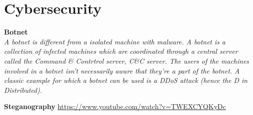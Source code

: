 \section{Cybersecurity}

\textbf{Botnet}   \cite{cybersecurity:botnets} \\
\textit{A botnet is different from a isolated machine with malware. A botnet is a collection of infected machines which are coordinated through a central server called the Command & Contrtrol server, C&C server. The users of the machines involved in a botnet isn't necessarily aware that they're a part of the botnet.  A classic example for which a botnet can be used is a DDoS attack (hence the D in Distributed). } 

\textbf{Steganography} \url{https://www.youtube.com/watch?v=TWEXCYQKyDc} 



